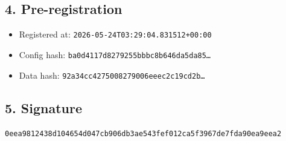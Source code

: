 \documentclass{article}
\begin{document}
\subsection*{4. Pre-registration}
\begin{itemize}
\item Registered at: \texttt{2026-05-24T03:29:04.831512+00:00}
\item Config hash: \texttt{ba0d4117d8279255bbbc8b646da5da85\dots}
\item Data hash: \texttt{92a34cc4275008279006eeec2c19cd2b\dots}
\end{itemize}
\subsection*{5. Signature}
\texttt{0eea9812438d104654d047cb906db3ae543fef012ca5f3967de7fda90ea9eea2}\\
\end{document}
